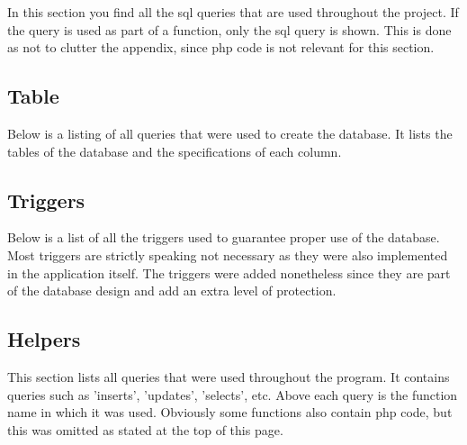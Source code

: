 In this section you find all the sql queries that are used throughout the project.
If the query is used as part of a function, only the sql query is shown. This is done as not to
clutter the appendix, since php code is not relevant for this section. 

\subsection{Table}
Below is a listing of all queries that were used to create the database. It lists
the tables of the database and the specifications of each column.


\subsection{Triggers}
Below is a list of all the triggers used to guarantee proper use of the database.
Most triggers are strictly speaking not necessary as they were also implemented in the
application itself. The triggers were added nonetheless since they are part of the database
design and add an extra level of protection.


\subsection{Helpers}
This section lists all queries that were used throughout the program. It contains queries such
as 'inserts', 'updates', 'selects', etc. Above each query is the function name in which it was
used. Obviously some functions also contain php code, but this was omitted as stated at the top of
this page.

